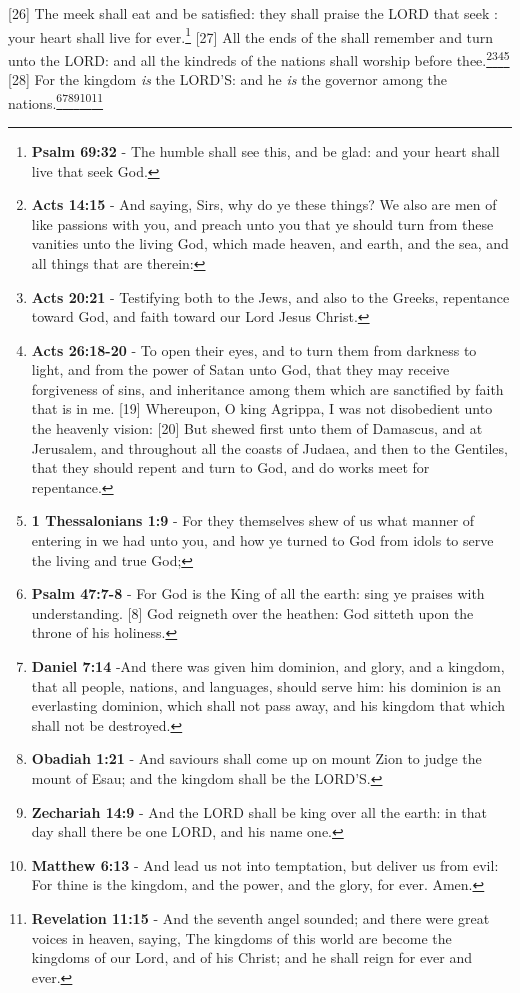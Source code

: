 [26] \textcolor[cmyk]{0.99998,1,0,0}{The meek shall eat and be satisfied: they shall praise the LORD that seek : your heart shall live for ever.}\footnote{\textbf{Psalm 69:32} - The humble shall see this, and be glad: and your heart shall live that seek God.}
[27] \textcolor[cmyk]{0.99998,1,0,0}{All the ends of the  shall remember and turn unto the LORD: and all the kindreds of the nations shall worship before thee.}\footnote{\textbf{Acts 14:15} - And saying, Sirs, why do ye these things? We also are men of like passions with you, and preach unto you that ye should turn from these vanities unto the living God, which made heaven, and earth, and the sea, and all things that are therein:}\footnote{\textbf{Acts 20:21} - Testifying both to the Jews, and also to the Greeks, repentance toward God, and faith toward our Lord Jesus Christ.}\footnote{\textbf{Acts 26:18-20} - To open their eyes, and to turn them from darkness to light, and from the power of Satan unto God, that they may receive forgiveness of sins, and inheritance among them which are sanctified by faith that is in me. [19] Whereupon, O king Agrippa, I was not disobedient unto the heavenly vision: [20] But shewed first unto them of Damascus, and at Jerusalem, and throughout all the coasts of Judaea, and then to the Gentiles, that they should repent and turn to God, and do works meet for repentance.}\footnote{\textbf{1 Thessalonians 1:9} - For they themselves shew of us what manner of entering in we had unto you, and how ye turned to God from idols to serve the living and true God;}
[28] \textcolor[cmyk]{0.99998,1,0,0}{For the kingdom \emph{is} the LORD'S: and he \emph{is} the governor among the nations.}\footnote{\textbf{Psalm 47:7-8} - For God is the King of all the earth: sing ye praises with understanding. [8] God reigneth over the heathen: God sitteth upon the throne of his holiness.}\footnote{\textbf{Daniel 7:14} -And there was given him dominion, and glory, and a kingdom, that all people, nations, and languages, should serve him: his dominion is an everlasting dominion, which shall not pass away, and his kingdom that which shall not be destroyed.}\footnote{\textbf{Obadiah 1:21} - And saviours shall come up on mount Zion to judge the mount of Esau; and the kingdom shall be the LORD'S.}\footnote{\textbf{Zechariah 14:9} - And the LORD shall be king over all the earth: in that day shall there be one LORD, and his name one.}\footnote{\textbf{Matthew 6:13} - And lead us not into temptation, but deliver us from evil: For thine is the kingdom, and the power, and the glory, for ever. Amen.}\footnote{\textbf{Revelation 11:15} - And the seventh angel sounded; and there were great voices in heaven, saying, The kingdoms of this world are become the kingdoms of our Lord, and of his Christ; and he shall reign for ever and ever.}
